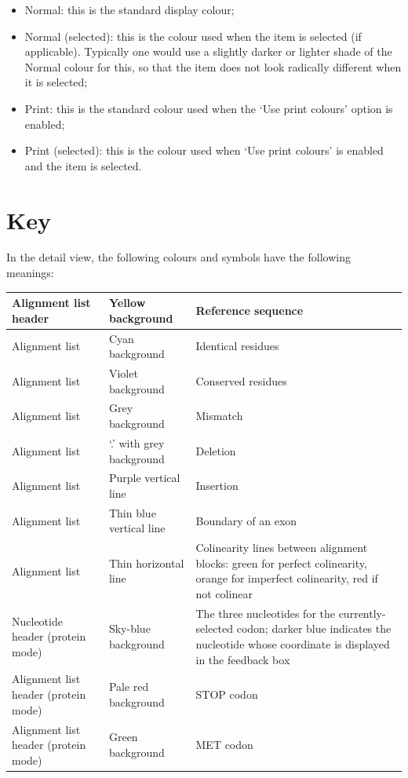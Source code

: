 \documentclass[letterpaper]{article}
\newcommand\liststyleWWviiiNumxx{%
\renewcommand\labelitemi{{\textbullet}}
\renewcommand\labelitemii{o}
\renewcommand\labelitemiii{[F0A7?]}
\renewcommand\labelitemiv{[F0B7?]}
}
\begin{document}
\liststyleWWviiiNumxx
\begin{itemize}
\item {Normal: this is the standard display colour;}
\item {Normal (selected): this is the colour used when the item is selected (if applicable). Typically one would use a slightly darker or lighter shade of the Normal colour for this, so that the item does not look radically different when it is selected;}
\item {Print: this is the standard colour used when the {\textquoteleft}Use print colours{\textquoteright} option is enabled;}
\item {Print (selected): this is the colour used when {\textquoteleft}Use print colours{\textquoteright} is enabled and the item is selected. }
\end{itemize}

{\color[rgb]{0.0,0.27058825,0.5254902}\section[Key]{Key}}
\hypertarget{RefHeading2681056909880}{}{
In the detail view, the following colours and symbols have the following
meanings:}

\bigskip

\begin{flushleft}
\tablehead{}
\begin{supertabular}{p{3.8009999cm}p{3.552cm}p{6.3cm}}
 Alignment list header &  Yellow background &  Reference sequence\\\hline
 Alignment list &  Cyan background &  Identical residues\\\hline
 Alignment list & Violet background & Conserved residues\\\hline
 Alignment list & Grey background & Mismatch\\\hline
 Alignment list & {\textquoteleft}.{\textquoteright} with grey background & Deletion\\\hline
 Alignment list & Purple vertical line & Insertion\\\hline
 Alignment list & Thin blue vertical line & Boundary of an exon\\\hline
 Alignment list & Thin horizontal line & Colinearity lines between alignment blocks: green for perfect colinearity, orange for imperfect colinearity, red if not colinear\\\hline
 Nucleotide header (protein mode) & Sky-blue background & The three nucleotides for the currently-selected codon; darker blue indicates the nucleotide whose coordinate is displayed in the feedback box\\\hline
 Alignment list header (protein mode) & Pale red background & STOP codon\\\hline
 Alignment list header (protein mode) & Green background & MET codon\\
\end{supertabular}
\end{flushleft}
\end{document}
